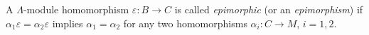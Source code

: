 A $\Lambda$-module homomorphism $\varepsilon : B \rightarrow C$ is called \textit{epimorphic} (or an \textit{epimorphism}) if $\alpha_1 \varepsilon = \alpha_2 \varepsilon$ implies $\alpha_1 = \alpha_2$ for any two homomorphisms $\alpha_i : C \rightarrow M$, $i = 1, 2$.
